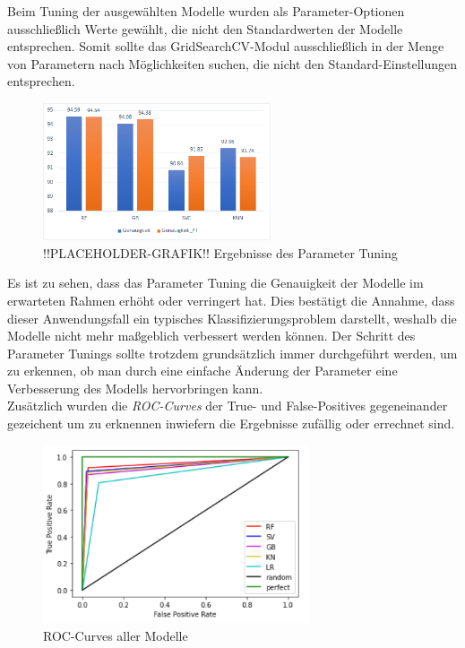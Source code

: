 Beim Tuning der ausgewählten Modelle wurden als Parameter-Optionen ausschließlich Werte gewählt, die nicht 
den Standardwerten der Modelle entsprechen. Somit sollte das GridSearchCV-Modul ausschließlich in der Menge 
von Parametern nach Möglichkeiten suchen, die nicht den Standard-Einstellungen entsprechen.

\begin{figure}[h]
    \centering
    \includegraphics[width=0.6\textwidth]{pic/param_eval.png}
    \caption{!!PLACEHOLDER-GRAFIK!! Ergebnisse des Parameter Tuning}
    \label{fig:PT_eval}
\end{figure}

Es ist zu sehen, dass das Parameter Tuning die Genauigkeit der Modelle im erwarteten Rahmen erhöht oder 
verringert hat. Dies bestätigt die Annahme, dass dieser Anwendungsfall ein typisches Klassifizierungsproblem 
darstellt, weshalb die Modelle nicht mehr maßgeblich verbessert werden können. Der Schritt des Parameter Tunings 
sollte trotzdem grundsätzlich immer durchgeführt werden, um zu erkennen, ob man durch eine einfache Änderung 
der Parameter eine Verbesserung des Modells hervorbringen kann.\\

Zusätzlich wurden die \textit{ROC-Curves} der True- und False-Positives gegeneinander gezeichent um zu erknennen 
inwiefern die Ergebnisse zufällig oder errechnet sind.

\begin{figure}[h]
    \centering
    \includegraphics[width=0.7\textwidth]{pic/roc_curves.png}
    \caption{ROC-Curves aller Modelle}
    \label{fig:PT_eval}
\end{figure}


